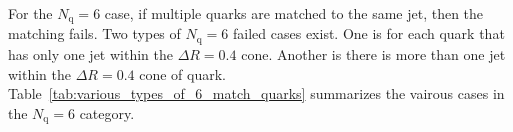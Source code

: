 \documentclass[12pt]{article}
\begin{document}
    For the $N_{\text{q}} = 6$ case, if multiple quarks are matched to the same jet, then the matching fails. Two types of $N_{\text{q}} = 6$ failed cases exist. One is for each quark that has only one jet within the $\Delta R=0.4$ cone. Another is there is more than one jet within the $\Delta R = 0.4$ cone of quark. Table~\ref{tab:various_types_of_6_match_quarks} summarizes the vairous cases in the $N_{\text{q}} = 6$ category.
    \begin{table}[htpb]
        \centering
        \caption{The quark matching table. $N_{\text{q}}$ is the number of quarks that can be matched to jets in an event.}
        \label{tab:number_of_quark_match_to_jet}
    \end{table}
\end{document}
